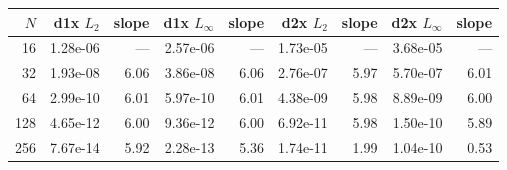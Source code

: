 \begin{tabular}{rrrrrrrrr}
\toprule
$N$ & d1x $L_2$ & slope & d1x $L_\infty$ & slope & d2x $L_2$ & slope & d2x $L_\infty$ & slope \\
\midrule
16 & 1.28e-06 & --- & 2.57e-06 & --- & 1.73e-05 & --- & 3.68e-05 & --- \\
32 & 1.93e-08 & 6.06 & 3.86e-08 & 6.06 & 2.76e-07 & 5.97 & 5.70e-07 & 6.01 \\
64 & 2.99e-10 & 6.01 & 5.97e-10 & 6.01 & 4.38e-09 & 5.98 & 8.89e-09 & 6.00 \\
128 & 4.65e-12 & 6.00 & 9.36e-12 & 6.00 & 6.92e-11 & 5.98 & 1.50e-10 & 5.89 \\
256 & 7.67e-14 & 5.92 & 2.28e-13 & 5.36 & 1.74e-11 & 1.99 & 1.04e-10 & 0.53 \\
\bottomrule
\end{tabular}
